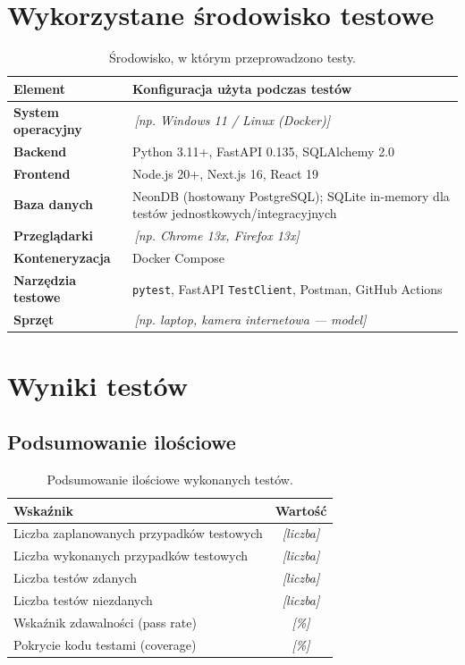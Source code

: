 \documentclass[11pt,a4paper]{article}
\newcommand{\luka}[1]{\colorbox{lukacol}{\,\textit{[#1]}\,}}
\begin{document}
\section{Wykorzystane środowisko testowe}

\begin{table}[h]
\centering
\begin{tabularx}{\textwidth}{>{\bfseries}p{3.5cm} Y}
\toprule
\textbf{Element} & \textbf{Konfiguracja użyta podczas testów} \\
\midrule
System operacyjny & \luka{np. Windows 11 / Linux (Docker)} \\
Backend & Python 3.11+, FastAPI 0.135, SQLAlchemy 2.0 \\
Frontend & Node.js 20+, Next.js 16, React 19 \\
Baza danych & NeonDB (hostowany PostgreSQL); SQLite in-memory dla testów jednostkowych/integracyjnych \\
Przeglądarki & \luka{np. Chrome 13x, Firefox 13x} \\
Konteneryzacja & Docker Compose \\
Narzędzia testowe & \texttt{pytest}, FastAPI \texttt{TestClient}, Postman, GitHub Actions \\
Sprzęt & \luka{np. laptop, kamera internetowa — model} \\
\bottomrule
\end{tabularx}
\caption{Środowisko, w którym przeprowadzono testy.}
\end{table}

\section{Wyniki testów}

\subsection{Podsumowanie ilościowe}
\begin{table}[h]
\centering
\begin{tabularx}{\textwidth}{Y c}
\toprule
\textbf{Wskaźnik} & \textbf{Wartość} \\
\midrule
Liczba zaplanowanych przypadków testowych & \luka{liczba} \\
Liczba wykonanych przypadków testowych & \luka{liczba} \\
Liczba testów zdanych & \luka{liczba} \\
Liczba testów niezdanych & \luka{liczba} \\
Wskaźnik zdawalności (pass rate) & \luka{\%} \\
Pokrycie kodu testami (coverage) & \luka{\%} \\
\bottomrule
\end{tabularx}
\caption{Podsumowanie ilościowe wykonanych testów.}
\end{table}
\end{document}
